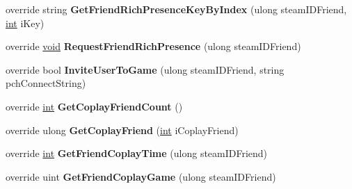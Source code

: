 \begin{DoxyCompactItemize}
\item 
\hypertarget{classValve_1_1Steamworks_1_1CSteamFriends_adcecfa4dbe3018de83af5d77c2ead4f0}{}override string {\bfseries Get\+Friend\+Rich\+Presence\+Key\+By\+Index} (ulong steam\+I\+D\+Friend, \hyperlink{SDL__thread_8h_a6a64f9be4433e4de6e2f2f548cf3c08e}{int} i\+Key)\label{classValve_1_1Steamworks_1_1CSteamFriends_adcecfa4dbe3018de83af5d77c2ead4f0}

\item 
\hypertarget{classValve_1_1Steamworks_1_1CSteamFriends_a6fa7dca547ead181cf1613cd2a71015c}{}override \hyperlink{SDL__audio_8h_a52835ae37c4bb905b903cbaf5d04b05f}{void} {\bfseries Request\+Friend\+Rich\+Presence} (ulong steam\+I\+D\+Friend)\label{classValve_1_1Steamworks_1_1CSteamFriends_a6fa7dca547ead181cf1613cd2a71015c}

\item 
\hypertarget{classValve_1_1Steamworks_1_1CSteamFriends_a0fe5f027df9b6bf49ab38721dadee391}{}override bool {\bfseries Invite\+User\+To\+Game} (ulong steam\+I\+D\+Friend, string pch\+Connect\+String)\label{classValve_1_1Steamworks_1_1CSteamFriends_a0fe5f027df9b6bf49ab38721dadee391}

\item 
\hypertarget{classValve_1_1Steamworks_1_1CSteamFriends_a73bfacf16dbbe8d5e759e05c6976e699}{}override \hyperlink{SDL__thread_8h_a6a64f9be4433e4de6e2f2f548cf3c08e}{int} {\bfseries Get\+Coplay\+Friend\+Count} ()\label{classValve_1_1Steamworks_1_1CSteamFriends_a73bfacf16dbbe8d5e759e05c6976e699}

\item 
\hypertarget{classValve_1_1Steamworks_1_1CSteamFriends_a1cfad35eeb47915c3486cb34ec2c4418}{}override ulong {\bfseries Get\+Coplay\+Friend} (\hyperlink{SDL__thread_8h_a6a64f9be4433e4de6e2f2f548cf3c08e}{int} i\+Coplay\+Friend)\label{classValve_1_1Steamworks_1_1CSteamFriends_a1cfad35eeb47915c3486cb34ec2c4418}

\item 
\hypertarget{classValve_1_1Steamworks_1_1CSteamFriends_a981add6fadcabc49cf308ec506a0446c}{}override \hyperlink{SDL__thread_8h_a6a64f9be4433e4de6e2f2f548cf3c08e}{int} {\bfseries Get\+Friend\+Coplay\+Time} (ulong steam\+I\+D\+Friend)\label{classValve_1_1Steamworks_1_1CSteamFriends_a981add6fadcabc49cf308ec506a0446c}

\item 
\hypertarget{classValve_1_1Steamworks_1_1CSteamFriends_a3c5454f5d2a68d5cab4fe8e9fc71e473}{}override uint {\bfseries Get\+Friend\+Coplay\+Game} (ulong steam\+I\+D\+Friend)\label{classValve_1_1Steamworks_1_1CSteamFriends_a3c5454f5d2a68d5cab4fe8e9fc71e473}


\end{DoxyCompactItemize}
